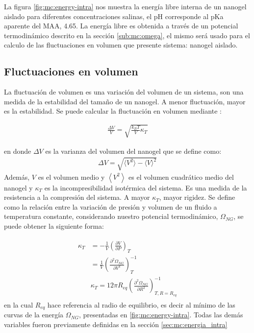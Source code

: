 	
	La figura \ref{fig:mc:energy-intra} nos muestra la energ\'ia libre interna de un nanogel aislado  para diferentes concentraciones salinas, el pH corresponde al pKa aparente del MAA, 4.65. 
	La energ\'ia libre es obtenida a trav\'es de un potencial termodin\'amico descrito en la secci\'on \ref{sub:mc:omega}, el mismo ser\'a usado para el calculo de las fluctuaciones en volumen que presente sistema: nanogel aislado.
	\subsection{Fluctuaciones en volumen}\label{sec:mc:fluctuacion}
	
La fluctuaci\'on de volumen es una variaci\'on del volumen de un sistema, son una medida de la estabilidad del tama\~no de un nanogel. A menor  fluctuaci\'on, mayor es la estabilidad.
	Se puede calcular la fluctuaci\'on en volumen mediante \cite{callen1991thermodynamics}:
	
	\begin{align}
		\frac{\Delta V}{V} = \sqrt{\frac{k_BT}{V}\kappa_T}
	\end{align}
	
	\noindent en donde $\Delta V$ es la varianza del volumen del nanogel que se define como:
	\begin{align}
		\Delta V = \sqrt{\langle V^2\rangle - \langle V \rangle^2}
	\end{align}
	Adem\'as, $V$ es el volumen medio y $\left< V^2\right>$  es el volumen cuadr\'atico medio del nanogel y $\kappa_T$ es la incompresibilidad isot\'ermica del sistema. Es una medida de la resistencia a la compresi\'on del sistema. A mayor $\kappa_T$, mayor rigidez.
	Se define como la relaci\'on entre la variaci\'on de presi\'on y  volumen de un fluido a temperatura constante, considerando nuestro potencial termodin\'amico, $\Omega_{NG}$, se puede obtener la siguiente forma:
	
	
	\begin{align}
		\begin{aligned}
			\kappa_T & = -\frac{1}{V} \left( \frac{\partial V}{\partial P}\right)_T \\
			& =\frac{1}{V} \left( \frac{\partial^2 \Omega_{NG}}{\partial V^2}\right)^{-1}_T \\
			& \kappa_T  = 12 \pi R_{eq} \left( \frac{\partial^2 \Omega_{NG}}{\partial R^2}\right)^{-1}_{T,R=R_{eq}}
		\end{aligned}
	\end{align}
	\noindent en la cual $R_{eq}$ hace referencia al radio de equilibrio, es decir al m\'inimo de las curvas de la energ\'ia $ \Omega_{NG}$, presentadas en \ref{fig:mc:energy-intra}. Todas las dem\'as variables fueron previamente definidas en la secci\'on \ref{sec:mc:energia_intra}
	
